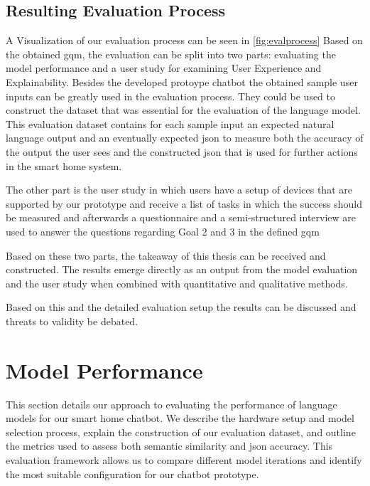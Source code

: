 \subsection{Resulting Evaluation Process}
A Visualization of our evaluation process can be seen in \cref{fig:evalprocess}
Based on the obtained \gls{gqm}, the evaluation can be split into two parts: evaluating the model performance and a user study for examining User Experience and Explainability.
Besides the developed protoype chatbot the obtained sample user inputs can be greatly used in the evaluation process.
They could be used to construct the dataset that was essential for the evaluation of the language model.
This evaluation dataset contains for each sample input an expected natural language output and an eventually expected \gls{json} to measure both the accuracy of the output the user sees and the constructed \gls{json} that is used for further actions in the smart home system.

The other part is the user study in which users have a setup of devices that are supported by our prototype and receive a list of tasks in which the success should be measured and afterwards a questionnaire and a semi-structured interview are used to answer the questions regarding Goal 2 and 3 in the defined \gls{gqm}

Based on these two parts, the takeaway of this thesis can be received and constructed.
The results emerge directly as an output from the model evaluation and the user study when combined with quantitative and qualitative methods.

Based on this and the detailed evaluation setup the results can be discussed and threats to validity be debated.


\section{Model Performance}
\label{sec:modelperform}
This section details our approach to evaluating the performance of language models for our smart home chatbot. We describe the hardware setup and model selection process, explain the construction of our evaluation dataset, and outline the metrics used to assess both semantic similarity and \gls{json} accuracy. This evaluation framework allows us to compare different model iterations and identify the most suitable configuration for our chatbot prototype.

